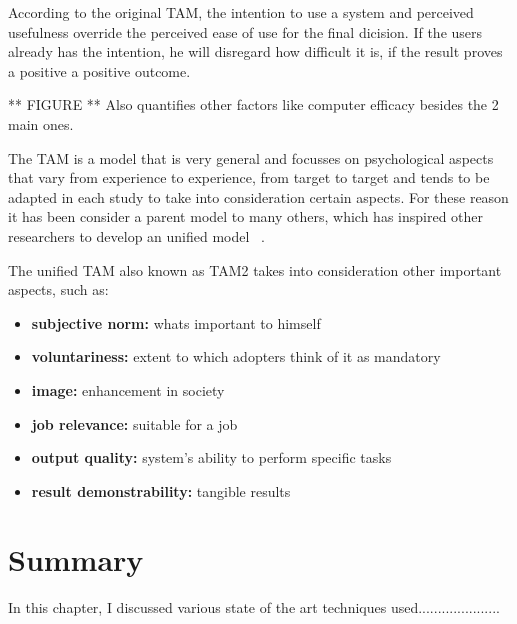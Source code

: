 According to the original TAM, the intention to use a system and perceived usefulness
override the perceived ease of use for the final dicision. If the users already has
the intention, he will disregard how difficult it is, if the result proves a positive
a positive outcome.

** FIGURE ** 
Also quantifies other factors like computer efficacy besides the 2 main ones.
~\cite{mcfarland_hamilton_2006}

The TAM is a model that is very general and focusses on psychological aspects that 
vary from experience to experience, from target to target and tends to be adapted
in each study to take into consideration certain aspects. For these reason it has
been consider a parent model to many others, which has inspired other researchers 
to develop an unified model ~\cite{venkatesh_davis_2000}.

The unified TAM also known as TAM2 takes into consideration other important aspects,
such as:

\begin{itemize}
    \item \textbf{subjective norm:}  whats important to himself
    \item \textbf{voluntariness:} extent to which adopters think of it as mandatory
    \item \textbf{image:}  enhancement in society
    \item \textbf{job relevance:} suitable for a job
    \item \textbf{output quality:}  system's ability to perform specific tasks
    \item \textbf{result demonstrability:} tangible results
\end{itemize}


\section{Summary}

In this chapter, I discussed various state of the art techniques used.....................
